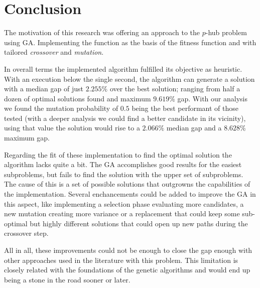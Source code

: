 \section{Conclusion}

The motivation of this research was offering an approach to the $p$-hub problem using GA. Implementing the 
 function as the basis of the fitness function and with tailored \emph{crossover} and \emph{mutation}.

In overall terms the implemented algorithm fulfilled its objective as heuristic. With an execution below
the single second, the algorithm can generate a solution with a median gap of just $2.255\%$ over the best 
solution; ranging from half a dozen of optimal solutions found and maximum $9.619\%$ gap. With our analysis
we found the mutation probability of $0.5$ being the best performant of those tested (with a deeper analysis
we could find a better candidate in its vicinity), using that value the solution would rise to a $2.066\%$
median gap and a $8.628\%$ maximum gap.

Regarding the fit of these implementation to find the optimal solution the algorithm lacks quite a bit.
The GA accomplishes good results for the easiest subproblems, but fails to find the solution with the upper
set of subproblems. The cause of this is a set of possible solutions that outgrowns the capabilities of the
implementation. Several enchancements could be added to improve the GA in this aspect, like implementing a
selection phase evaluating more candidates, a new mutation creating more variance or a replacement that could
keep some sub-optimal but highly different solutions that could open up new paths during the crossover step.

All in all, these improvements could not be enough to close the gap enough with other approaches used in the
literature with this problem. This limitation is closely related with the foundations of the genetic algorithms
and would end up being a stone in the road sooner or later.


